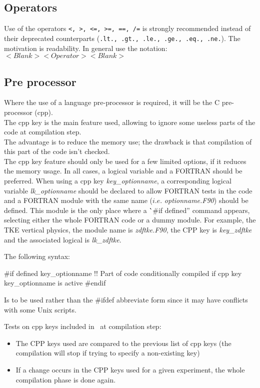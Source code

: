 \subsection{Operators}

Use of the operators \texttt{<, >, <=, >=, ==, /=} is strongly recommended instead of their deprecated counterparts
(\texttt{.lt., .gt., .le., .ge., .eq., .ne.}).
The motivation is readability.
In general use the notation: \\
$<Blank><Operator><Blank>$

\subsection{Pre processor}

Where the use of a language pre-processor is required, it will be the C pre-processor (cpp). \\
The cpp key is the main feature used, allowing to ignore some useless parts of the code at compilation step. \\
The advantage is to reduce the memory use; the drawback is that compilation of this part of the code isn't checked. \\
The cpp key feature should only be used for a few limited options, if it reduces the memory usage.
In all cases, a logical variable and a FORTRAN  should be preferred.
When using a cpp key \textit{key\_optionname},
a corresponding logical variable \textit{lk\_optionname} should be declared to
allow FORTRAN  tests in the code and
a FORTRAN module with the same name ($i.e.$ \textit{optionname.F90}) should be defined.
This module is the only place where a \``\#if defined'' command appears, selecting either the whole FORTRAN code or
a dummy module.
For example, the TKE vertical physics, the module name is \textit{zdftke.F90},
the CPP key is \textit{key\_zdftke} and the associated logical is \textit{lk\_zdftke}.

The following syntax:

\begin{forlines}
#if defined key_optionname
!! Part of code conditionally compiled if cpp key key_optionname is active
#endif
\end{forlines}

Is to be used rather than the \#ifdef abbreviate form since it may have conflicts with some Unix scripts.

Tests on cpp keys included in \NEMO\ at compilation step:

\begin{itemize}
\item
  The CPP keys used are compared to the previous list of cpp keys
  (the compilation will stop if trying to specify a non-existing key)
\item
  If a change occurs in the CPP keys used for a given experiment, the whole compilation phase is done again.
\end{itemize}

